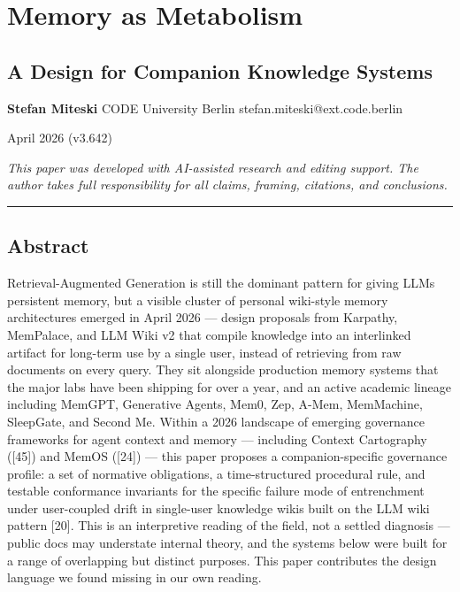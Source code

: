 \documentclass[
  11pt,
]{article}
\author{}
\date{}
\begin{document}
\hypertarget{memory-as-metabolism}{%
\section{Memory as Metabolism}\label{memory-as-metabolism}}

\hypertarget{a-design-for-companion-knowledge-systems}{%
\subsection{A Design for Companion Knowledge
Systems}\label{a-design-for-companion-knowledge-systems}}

\textbf{Stefan Miteski} CODE University Berlin
stefan.miteski@ext.code.berlin

April 2026 (v3.642)

\emph{This paper was developed with AI-assisted research and editing
support. The author takes full responsibility for all claims, framing,
citations, and conclusions.}

\begin{center}\rule{0.5\linewidth}{0.5pt}\end{center}

\hypertarget{abstract}{%
\subsection{Abstract}\label{abstract}}

Retrieval-Augmented Generation is still the dominant pattern for giving
LLMs persistent memory, but a visible cluster of personal wiki-style
memory architectures emerged in April 2026 --- design proposals from
Karpathy, MemPalace, and LLM Wiki v2 that compile knowledge into an
interlinked artifact for long-term use by a single user, instead of
retrieving from raw documents on every query. They sit alongside
production memory systems that the major labs have been shipping for
over a year, and an active academic lineage including MemGPT, Generative
Agents, Mem0, Zep, A-Mem, MemMachine, SleepGate, and Second Me. Within a
2026 landscape of emerging governance frameworks for agent context and
memory --- including Context Cartography ({[}45{]}) and MemOS ({[}24{]})
--- this paper proposes a companion-specific governance profile: a set
of normative obligations, a time-structured procedural rule, and
testable conformance invariants for the specific failure mode of
entrenchment under user-coupled drift in single-user knowledge wikis
built on the LLM wiki pattern {[}20{]}. This is an interpretive reading
of the field, not a settled diagnosis --- public docs may understate
internal theory, and the systems below were built for a range of
overlapping but distinct purposes. This paper contributes the design
language we found missing in our own reading.
\end{document}

